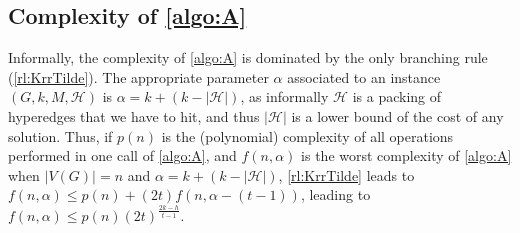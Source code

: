 \documentclass{amsart}
\newcommand{\mH}{\mathcal{H}}
\newcommand{\ruleref}[1]{\hyperref[#1]{\ref*{#1}}}
\begin{document}
\subsection{Complexity of \autoref{algo:A}}
Informally, the complexity of \autoref{algo:A} is dominated by the only branching rule (\ruleref{rl:KrrTilde}). The appropriate parameter $\alpha$ associated to an instance $(G,k,M,\mH)$ is $\alpha=k+(k-|\mH|)$, as informally $\mH$ is a packing of hyperedges that we have to hit, and thus $|\mH|$ is a lower bound of the cost of any solution. Thus, if $p(n)$ is the (polynomial) complexity of all operations performed in one call of \autoref{algo:A}, and $f(n,\alpha)$ is the worst complexity of \autoref{algo:A} when $|V(G)|=n$ and $\alpha=k+(k-|\mH|)$, \ruleref{rl:KrrTilde} leads to $f(n,\alpha) \le p(n)+(2t)f(n,\alpha-(t-1))$, leading to $f(n,\alpha) \le p(n)(2t)^{\frac{2k-h}{t-1}}$.
\end{document}
